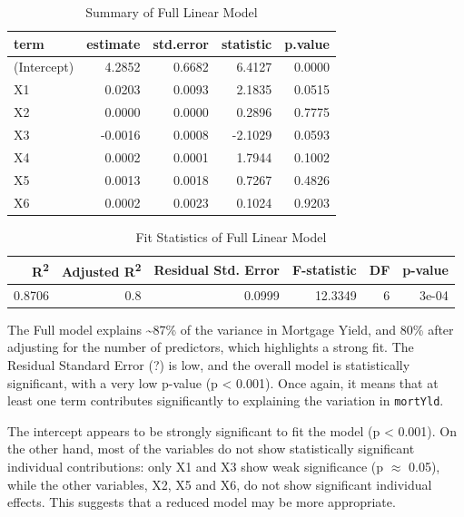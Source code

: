 \documentclass[
  11pt,
]{article}
\begin{document}
\begin{table}[!h]
\centering
\caption{\label{tab:unnamed-chunk-10}Summary of Full Linear Model}
\centering
\fontsize{8}{10}\selectfont
\begin{tabular}[t]{lrrrr}
\toprule
term & estimate & std.error & statistic & p.value\\
\midrule
(Intercept) & 4.2852 & 0.6682 & 6.4127 & 0.0000\\
X1 & 0.0203 & 0.0093 & 2.1835 & 0.0515\\
X2 & 0.0000 & 0.0000 & 0.2896 & 0.7775\\
X3 & -0.0016 & 0.0008 & -2.1029 & 0.0593\\
X4 & 0.0002 & 0.0001 & 1.7944 & 0.1002\\
\addlinespace
X5 & 0.0013 & 0.0018 & 0.7267 & 0.4826\\
X6 & 0.0002 & 0.0023 & 0.1024 & 0.9203\\
\bottomrule
\end{tabular}
\end{table}
\begin{table}[!h]
\centering
\caption{\label{tab:unnamed-chunk-11}Fit Statistics of Full Linear Model}
\centering
\fontsize{8}{10}\selectfont
\begin{tabular}[t]{rrrrrr}
\toprule
R\textsuperscript{2} & Adjusted R\textsuperscript{2} & Residual Std. Error & F-statistic & DF & p-value\\
\midrule
0.8706 & 0.8 & 0.0999 & 12.3349 & 6 & 3e-04\\
\bottomrule
\end{tabular}
\end{table}

The Full model explains \textasciitilde87\% of the variance in Mortgage
Yield, and 80\% after adjusting for the number of predictors, which
highlights a strong fit. The Residual Standard Error (?) is low, and the
overall model is statistically significant, with a very low p-value (p
\textless{} 0.001). Once again, it means that at least one term
contributes significantly to explaining the variation in
\texttt{mortYld}.

The intercept appears to be strongly significant to fit the model (p
\textless{} 0.001). On the other hand, most of the variables do not show
statistically significant individual contributions: only X1 and X3 show
weak significance (p \(\approx\) 0.05), while the other variables, X2,
X5 and X6, do not show significant individual effects. This suggests
that a reduced model may be more appropriate.
\end{document}
